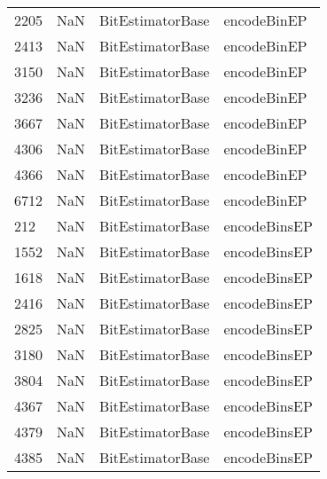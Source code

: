 \begin{tabular}{llll}
2205 &                   NaN &           BitEstimatorBase &                               encodeBinEP \\
2413 &                   NaN &           BitEstimatorBase &                               encodeBinEP \\
3150 &                   NaN &           BitEstimatorBase &                               encodeBinEP \\
3236 &                   NaN &           BitEstimatorBase &                               encodeBinEP \\
3667 &                   NaN &           BitEstimatorBase &                               encodeBinEP \\
4306 &                   NaN &           BitEstimatorBase &                               encodeBinEP \\
4366 &                   NaN &           BitEstimatorBase &                               encodeBinEP \\
6712 &                   NaN &           BitEstimatorBase &                               encodeBinEP \\
212  &                   NaN &           BitEstimatorBase &                              encodeBinsEP \\
1552 &                   NaN &           BitEstimatorBase &                              encodeBinsEP \\
1618 &                   NaN &           BitEstimatorBase &                              encodeBinsEP \\
2416 &                   NaN &           BitEstimatorBase &                              encodeBinsEP \\
2825 &                   NaN &           BitEstimatorBase &                              encodeBinsEP \\
3180 &                   NaN &           BitEstimatorBase &                              encodeBinsEP \\
3804 &                   NaN &           BitEstimatorBase &                              encodeBinsEP \\
4367 &                   NaN &           BitEstimatorBase &                              encodeBinsEP \\
4379 &                   NaN &           BitEstimatorBase &                              encodeBinsEP \\
4385 &                   NaN &           BitEstimatorBase &                              encodeBinsEP \\

\end{tabular}
